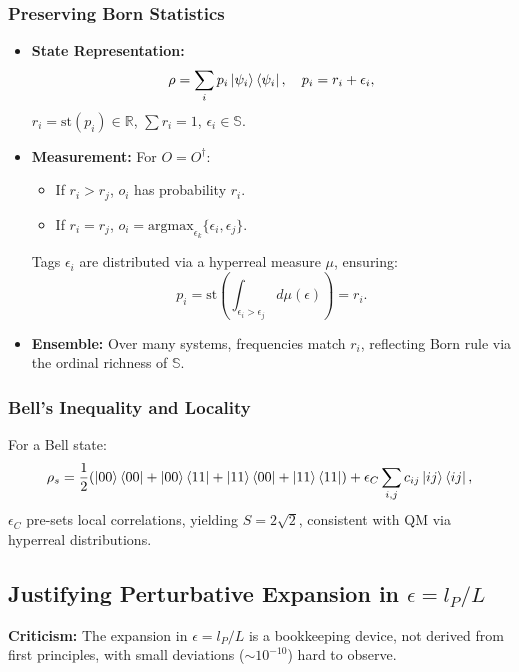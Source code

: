 \documentclass{article}
\begin{document}
\subsubsection{Preserving Born Statistics}
\begin{itemize}
    \item \textbf{State Representation:} 
    \begin{equation}
    \rho = \sum_i p_i \ket{\psi_i}\bra{\psi_i}, \quad p_i = r_i + \epsilon_i,
    \end{equation}
    \(r_i = \text{st}(p_i) \in \mathbb{R}\), \(\sum r_i = 1\), \(\epsilon_i \in \mathbb{S}\).
    \item \textbf{Measurement:} For \(O = O^\dagger\):
    \begin{itemize}
        \item If \(r_i > r_j\), \(o_i\) has probability \(r_i\).
        \item If \(r_i = r_j\), \(o_i = \text{argmax}_{\epsilon_k} \{ \epsilon_i, \epsilon_j \}\).
    \end{itemize}
    Tags \(\epsilon_i\) are distributed via a hyperreal measure \(\mu\), ensuring:
    \begin{equation}
    p_i = \text{st}\left( \int_{\epsilon_i > \epsilon_j} d\mu(\epsilon) \right) = r_i.
    \end{equation}
    \item \textbf{Ensemble:} Over many systems, frequencies match \(r_i\), reflecting Born rule via the ordinal richness of \(\mathbb{S}\).
\end{itemize}

\subsubsection{Bell’s Inequality and Locality}
For a Bell state:
\begin{equation}
\rho_s = \frac{1}{2} (\ket{00}\bra{00} + \ket{00}\bra{11} + \ket{11}\bra{00} + \ket{11}\bra{11}) + \epsilon_C \sum_{i,j} c_{ij} \ket{ij}\bra{ij},
\end{equation}
\(\epsilon_C\) pre-sets local correlations, yielding \(S = 2\sqrt{2}\), consistent with QM via hyperreal distributions.

\subsection{Justifying Perturbative Expansion in \(\epsilon = l_P / L\)}
\textbf{Criticism:} The expansion in \(\epsilon = l_P / L\) is a bookkeeping device, not derived from first principles, with small deviations (\(\sim 10^{-10}\)) hard to observe.
\end{document}
